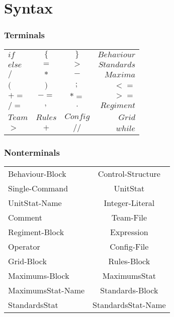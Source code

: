 \section{Syntax}
	\subsubsection{Terminals}
		
		\begin{tabular}{ l c c r}
			$if  	 $& $\{ 	 $&$ \} 	  $&$ Behaviour$  \\
		  	$else	 $&$ = 		 $&$ >  	  $&$ Standards$  \\
		 	$/ 		 $&$ *  	 $&$ -  	  $&$ Maxima$	  \\
		 	$( 		 $&$ )  	 $&$ ;  	  $&$ < =$		  \\
		 	$+= 	 $&$ -=   	 $&$ *= 	  $&$ > =$	    \\
		 	$/= 	 $&$ ,     	 $&$ .  	  $&$ Regiment$   \\
			$Team	 $&$ Rules   $&$ Config   $&$ Grid$	   \\
			$>		 $&$   + 	 $&$ //	 	  $&$ while $   \\
		\end{tabular}
	\subsubsection{Nonterminals}
		\begin{tabular}{l c}
			Behaviour-Block   & Control-Structure   \\
			Single-Command    & UnitStat 			\\
			UnitStat-Name	  & Integer-Literal		\\
			Comment			  & Team-File 			\\
			Regiment-Block	  & Expression			\\
			Operator		  & Config-File			\\
			Grid-Block	      & Rules-Block 		\\
			Maximums-Block	  & MaximumsStat		\\
			MaximumsStat-Name & Standards-Block	 	\\
			StandardsStat	  & StandardsStat-Name 	\\
		\end{tabular}
	
